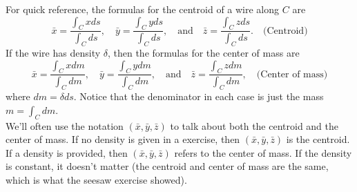 For quick reference, the formulas for the centroid of a wire along $C$ are
$$
\bar x = \frac{\int_C x ds}{\int_C  ds},\quad
\bar y = \frac{\int_C y ds}{\int_C  ds},\quad 
\text{and}\quad
\bar z = \frac{\int_C z ds}{\int_C  ds}.  \quad\text{(Centroid)}
$$
If the wire has density $\delta$, then the formulas for the center of mass are 
%
$$
\bar x = \frac{\int_C x dm}{\int_C  dm},\quad
\bar y = \frac{\int_C y dm}{\int_C  dm},\quad 
\text{and}\quad
\bar z = \frac{\int_C z dm}{\int_C  dm},  \quad\text{(Center of mass)}
$$
where $dm=\delta ds$. Notice that the denominator in each case is just the mass $m=\int_C dm$.\\

We'll often use the notation $(\bar x, \bar y,\bar z)$ to talk about both the centroid and the center of mass. If no density is given in a exercise, then $(\bar x, \bar y,\bar z)$ is the centroid. If a density is provided, then $(\bar x, \bar y,\bar z)$ refers to the center of mass. If the density is constant, it doesn't matter (the centroid and center of mass are the same, which is what the seesaw exercise showed).

